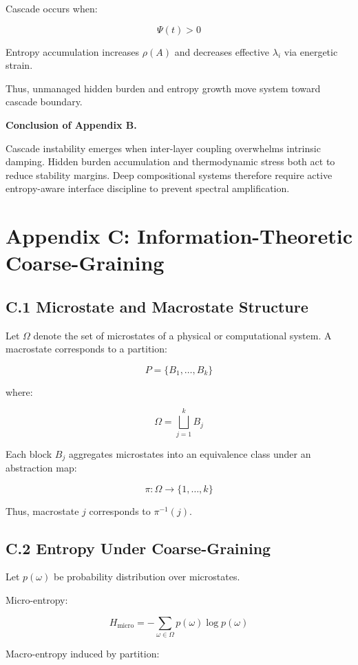 \documentclass[11pt,openany]{book}
\begin{document}
Cascade occurs when:

\[
\Psi(t) > 0
\]

Entropy accumulation increases $\rho(A)$ 
and decreases effective $\lambda_i$ via energetic strain.

Thus, unmanaged hidden burden and entropy growth 
move system toward cascade boundary.

\bigskip

\textbf{Conclusion of Appendix B.}

Cascade instability emerges when inter-layer coupling 
overwhelms intrinsic damping. Hidden burden accumulation 
and thermodynamic stress both act to reduce stability margins. 
Deep compositional systems therefore require active 
entropy-aware interface discipline to prevent spectral amplification.

\section{Appendix C: Information-Theoretic Coarse-Graining}

\subsection{C.1 Microstate and Macrostate Structure}

Let $\Omega$ denote the set of microstates of a physical or computational system.
A macrostate corresponds to a partition:

\[
P = \{B_1, \dots, B_k\}
\]

where:

\[
\Omega = \bigsqcup_{j=1}^{k} B_j
\]

Each block $B_j$ aggregates microstates into an equivalence class 
under an abstraction map:

\[
\pi : \Omega \to \{1,\dots,k\}
\]

Thus, macrostate $j$ corresponds to $\pi^{-1}(j)$.

\subsection{C.2 Entropy Under Coarse-Graining}

Let $p(\omega)$ be probability distribution over microstates.

Micro-entropy:

\[
H_{\text{micro}}
=
- \sum_{\omega \in \Omega} p(\omega)\log p(\omega)
\]

Macro-entropy induced by partition:
\end{document}
